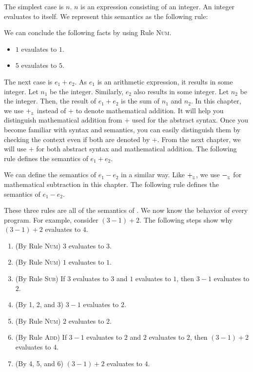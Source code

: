 The simplest case is $n$. $n$ is an expression consisting of an integer. An
integer evaluates to itself. We represent this semantics as the following rule:


We can conclude the following facts by using Rule \textsc{Num}.

\begin{itemize}
  \item $1$ evaulates to $1$.
  \item $5$ evaulates to $5$.
\end{itemize}

The next case is $e_1+e_2$. As $e_1$ is an arithmetic expression, it results in
some integer. Let $n_1$ be the integer. Similarly, $e_2$ also results in some
integer. Let $n_2$ be the integer. Then, the result of $e_1+e_2$ is the sum of
$n_1$ and $n_2$. In this chapter, we use $+_{{}_{\mathbb{Z}}}$ instead of $+$ to denote
mathematical addition. It will help you distinguish mathematical addition from
$+$ used for the abstract syntax. Once you become familiar with syntax and
semantics, you can easily distinguish them by checking the context even if both
are denoted by $+$. From the next chapter, we will use $+$ for both abstract
syntax and mathematical addition. The following rule defines the semantics of
$e_1+e_2$.


We can define the semantics of $e_1-e_2$ in a similar way. Like $+_{{}_{\mathbb{Z}}}$,
we use $-_{{}_{\mathbb{Z}}}$ for mathematical subtraction in this chapter. The
following rule defines the semantics of $e_1-e_2$.


These three rules are all of the semantics of \Lang. We now know the behavior of
every \Lang program. For example, consider $(3-1)+2$. The following steps
show why $(3-1)+2$ evaluates to $4$.

\begin{enumerate}
  \item (By Rule \textsc{Num}) $3$ evaluates to $3$.
  \item (By Rule \textsc{Num}) $1$ evaluates to $1$.
  \item (By Rule \textsc{Sub}) If $3$ evaluates to $3$ and $1$ evaluates to $1$, then $3-1$
    evaluates to $2$.
  \item (By 1, 2, and 3) $3-1$ evaluates to $2$.
  \item (By Rule \textsc{Num}) $2$ evaluates to $2$.
  \item (By Rule \textsc{Add}) If $3-1$ evaluates to $2$ and $2$ evaluates to $2$, then
    $(3-1)+2$ evaluates to $4$.
  \item (By 4, 5, and 6) $(3-1)+2$ evaluates to $4$.
\end{enumerate}

